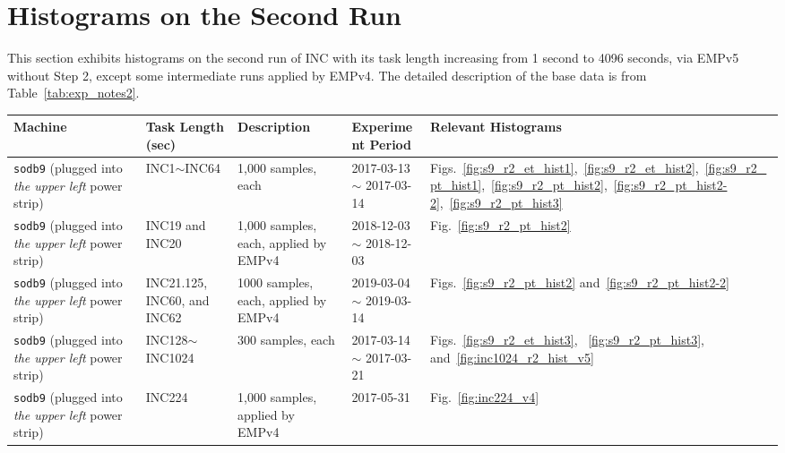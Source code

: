 \section{Histograms on the Second Run~\label{sec:sodb9_r2_hist}} 
This section exhibits histograms on the second run of 
INC with its task length increasing from 1 second to 4096 seconds, via EMPv5 without Step 2, except 
some intermediate runs applied by EMPv4. 
The detailed description of the base data is from Table~\ref{tab:exp_notes2}.

\begin{table}[h]
\begin{center}
\begin{tabular}{|p{2cm}|p{3cm}|p{3cm}|p{4cm}|p{4cm}|} \hline
Machine & Task Length (sec) & Description & Experiment Period & Relevant \linebreak Histograms\\ \hline
{\tt sodb9} (plugged into {\em the upper left} power strip) &  INC1$\sim$INC64 & 1,000 samples, each & 2017-03-13 $\sim$ 2017-03-14 & Figs.~\ref{fig:s9_r2_et_hist1},~\ref{fig:s9_r2_et_hist2},~\ref{fig:s9_r2_pt_hist1},~\ref{fig:s9_r2_pt_hist2},~\ref{fig:s9_r2_pt_hist2-2},~\ref{fig:s9_r2_pt_hist3}\\ \hline 

{\tt sodb9} (plugged into {\em the upper left} power strip) &  INC19 and INC20 & 1,000 samples, each, applied by EMPv4 & 2018-12-03 $\sim$ 2018-12-03 & Fig.~\ref{fig:s9_r2_pt_hist2}\\ \hline

{\tt sodb9} (plugged into {\em the upper left} power strip) &  INC21.125, INC60, and INC62 & 1000 samples, each, applied by EMPv4 & 2019-03-04 $\sim$ 2019-03-14 & Figs.~\ref{fig:s9_r2_pt_hist2} and~\ref{fig:s9_r2_pt_hist2-2}\\ \hline

{\tt sodb9} (plugged into {\em the upper left} power strip) &  INC128$\sim$INC1024 & 300 samples, each & 2017-03-14 $\sim$ 2017-03-21 & 
Figs.~\ref{fig:s9_r2_et_hist3}, ~\ref{fig:s9_r2_pt_hist3}, and~\ref{fig:inc1024_r2_hist_v5}\\ \hline

{\tt sodb9} (plugged into {\em the upper left} power strip) &  INC224 & 1,000 samples, applied by EMPv4 & 2017-05-31 & Fig.~\ref{fig:inc224_v4}\\ \hline


\end{tabular}
\end{center}
\end{table}
